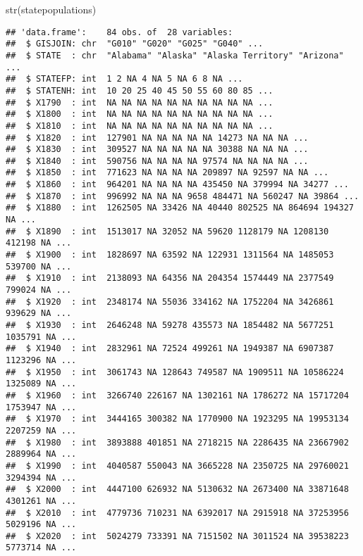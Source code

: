 \documentclass[
]{article}
\newenvironment{Shaded}{\begin{snugshade}}{\end{snugshade}}
\newcommand{\FunctionTok}[1]{\textcolor[rgb]{0.00,0.00,0.00}{#1}}
\newcommand{\NormalTok}[1]{#1}
\newcommand{\SpecialCharTok}[1]{\textcolor[rgb]{0.00,0.00,0.00}{#1}}
\begin{document}
\begin{Shaded}
\begin{Highlighting}[]
\FunctionTok{str}\NormalTok{(statepopulations)}
\end{Highlighting}
\end{Shaded}

\begin{verbatim}
## 'data.frame':    84 obs. of  28 variables:
##  $ GISJOIN: chr  "G010" "G020" "G025" "G040" ...
##  $ STATE  : chr  "Alabama" "Alaska" "Alaska Territory" "Arizona" ...
##  $ STATEFP: int  1 2 NA 4 NA 5 NA 6 8 NA ...
##  $ STATENH: int  10 20 25 40 45 50 55 60 80 85 ...
##  $ X1790  : int  NA NA NA NA NA NA NA NA NA NA ...
##  $ X1800  : int  NA NA NA NA NA NA NA NA NA NA ...
##  $ X1810  : int  NA NA NA NA NA NA NA NA NA NA ...
##  $ X1820  : int  127901 NA NA NA NA NA 14273 NA NA NA ...
##  $ X1830  : int  309527 NA NA NA NA NA 30388 NA NA NA ...
##  $ X1840  : int  590756 NA NA NA NA 97574 NA NA NA NA ...
##  $ X1850  : int  771623 NA NA NA NA 209897 NA 92597 NA NA ...
##  $ X1860  : int  964201 NA NA NA NA 435450 NA 379994 NA 34277 ...
##  $ X1870  : int  996992 NA NA NA 9658 484471 NA 560247 NA 39864 ...
##  $ X1880  : int  1262505 NA 33426 NA 40440 802525 NA 864694 194327 NA ...
##  $ X1890  : int  1513017 NA 32052 NA 59620 1128179 NA 1208130 412198 NA ...
##  $ X1900  : int  1828697 NA 63592 NA 122931 1311564 NA 1485053 539700 NA ...
##  $ X1910  : int  2138093 NA 64356 NA 204354 1574449 NA 2377549 799024 NA ...
##  $ X1920  : int  2348174 NA 55036 334162 NA 1752204 NA 3426861 939629 NA ...
##  $ X1930  : int  2646248 NA 59278 435573 NA 1854482 NA 5677251 1035791 NA ...
##  $ X1940  : int  2832961 NA 72524 499261 NA 1949387 NA 6907387 1123296 NA ...
##  $ X1950  : int  3061743 NA 128643 749587 NA 1909511 NA 10586224 1325089 NA ...
##  $ X1960  : int  3266740 226167 NA 1302161 NA 1786272 NA 15717204 1753947 NA ...
##  $ X1970  : int  3444165 300382 NA 1770900 NA 1923295 NA 19953134 2207259 NA ...
##  $ X1980  : int  3893888 401851 NA 2718215 NA 2286435 NA 23667902 2889964 NA ...
##  $ X1990  : int  4040587 550043 NA 3665228 NA 2350725 NA 29760021 3294394 NA ...
##  $ X2000  : int  4447100 626932 NA 5130632 NA 2673400 NA 33871648 4301261 NA ...
##  $ X2010  : int  4779736 710231 NA 6392017 NA 2915918 NA 37253956 5029196 NA ...
##  $ X2020  : int  5024279 733391 NA 7151502 NA 3011524 NA 39538223 5773714 NA ...
\end{verbatim}

\begin{Shaded}
\end{Shaded}
\end{document}
